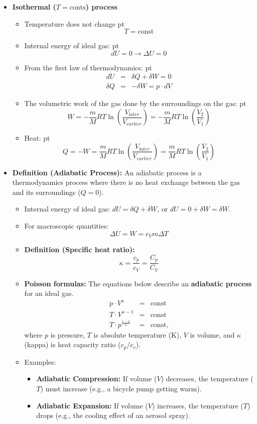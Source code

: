\documentclass[t,aspectratio=169]{beamer}
\begin{document}
\begin{frame}
\begin{itemize}
\pagebreak
\item \textbf{Isothermal ($T=\text{conts}$) process}
\begin{itemize}
\item Temperature does not change
 pt
$$ T = \text{const} $$
\item Internal energy of ideal gas:
 pt
$$ dU = 0 \rightarrow \Delta U = 0$$
\item From the first law of thermodynamics:
 pt
\begin{eqnarray*}
dU &=& \delta Q + \delta W = 0 \\
\delta Q &=& -\delta W = p\cdot dV
\end{eqnarray*}
\item The volumetric work of the gas done by the surroundings on the gas:
 pt
$$W = -\frac{m}{M}RT \ln \left(\frac{V_{later}}{V_{earlier}}\right) = -\frac{m}{M}RT \ln \left(\frac{V_{2}}{V_{1}}\right)$$

\item Heat:
 pt
$$Q = -W = \frac{m}{M}RT \ln \left(\frac{V_{later}}{V_{earlier}}\right)= \frac{m}{M}RT \ln \left(\frac{V_{2}}{V_{1}}\right) $$

\end{itemize}

\pagebreak

\item \textbf{Definition (Adiabatic Process):} An adiabatic process is a thermodynamics process where there is no heat exchange between the gas and its surroundings ($Q=0$). 
\begin{itemize}
\item Internal energy of ideal gas: $dU=\delta Q +\delta W$, or $dU = 0 + \delta W = \delta W$.
\item For macroscopic quantities: 
$$\Delta U = W = c_V m \Delta T$$
\item \textbf{Definition (Specific heat ratio):} 
$$ \kappa = \frac{c_p}{c_V} = \frac{C_{p}}{C_{V}}$$

\pagebreak  
\item \textbf{Poisson formulas:} The equations below describe an \textbf{adiabatic process} for an ideal gas.
\begin{eqnarray*}
  p\cdot V^{\kappa}&=&\text{const}\\
  T\cdot V^{\kappa-1}&=&\text{const}\\
  T \cdot p^{\frac{1-\kappa}{\kappa}} &=& \text{const},
\end{eqnarray*}
where $p$ is pressure, $T$ is absolute temperature (K), $V$ is volume, and $\kappa$ (kappa) is heat capacity ratio ($c_p/c_v$).
\item Examples:
\begin{itemize}
\item \textbf{Adiabatic Compression:} If volume ($V$) decreases, the temperature ($T$) must increase (e.g., a bicycle pump getting warm).
\item \textbf{Adiabatic Expansion:} If volume ($V$) increases, the temperature ($T$) drops (e.g., the cooling effect of an aerosol spray).
\end{itemize}


\end{itemize}
\end{itemize}
\end{frame}
\end{document}
